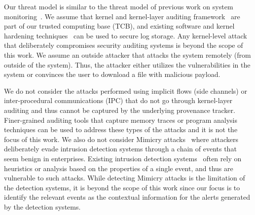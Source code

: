 %





Our threat model is similar to the threat model of previous work on system monitoring~\cite{backtracking,backtracking2,loggc,gao2018aiql,gao2018saql,liu2018priotracker,hassan2019nodoze}. 
We assume that kernel and kernel-layer auditing framework~\cite{auditd,etw,dtrace,sysdig} are part of our trusted computing base (TCB), and existing software and kernel hardening techniques~\cite{trustkernel,tamperlog} can be used to secure log storage.
Any kernel-level attack that deliberately compromises security auditing systems is beyond the scope of this work.
We assume an outside attacker that attacks the system remotely (from outside of the system). Thus, the attacker either utilizes the vulnerabilities in the system or convinces the user to download a file with malicious payload.



We do not consider the attacks performed using implicit flows (\eg side channels) or inter-procedural communications (IPC) that do not go through kernel-layer auditing and thus cannot be captured by the underlying provenance tracker.
Finer-grained auditing tools that capture memory traces or program analysis techniques can be used to address these types of the attacks and it is not the focus of this work.
We also do not consider Mimicry attacks~\cite{mimicry} where attackers deliberately evade intrusion detection systems through a chain of events that seem benign in enterprises. 
Existing intrusion detection systems~\cite{securitybook,intrusionbook,netwrix} often rely on heuristics or analysis based on the properties of a single event, and thus are vulnerable to such attacks.
While detecting Mimicry attacks is the limitation of the detection systems, it is beyond the scope of this work since our focus is to identify the relevant events as the contextual information for the alerts generated by the detection systems.

